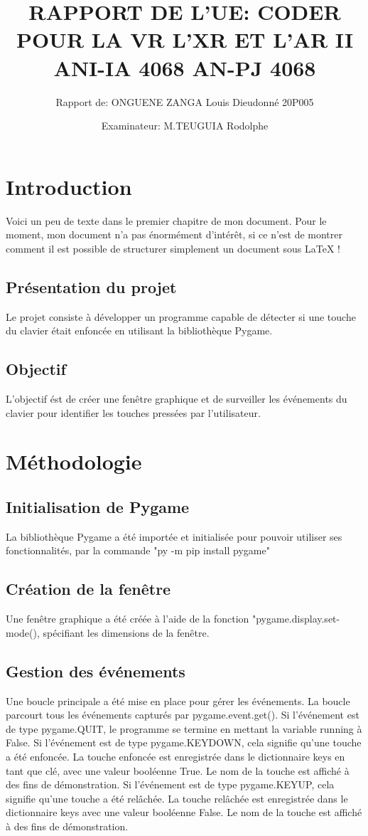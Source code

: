 \documentclass[11pt]{report}
\title{RAPPORT DE L'UE: CODER POUR LA VR L'XR ET L'AR II	ANI-IA 4068 AN-PJ 4068}
\author{Rapport de: ONGUENE ZANGA Louis Dieudonné 20P005}
\date{Examinateur: M.TEUGUIA Rodolphe}
\begin{document}
	\maketitle
	\tableofcontents
	

	\chapter{Introduction}
	Voici un peu de texte dans le premier chapitre de mon document. Pour le moment, mon document n'a pas énormément d'intérêt, si ce n'est de montrer comment il est possible de structurer simplement un document sous LaTeX !
	\section{Présentation du projet}
	Le projet consiste à développer un programme capable de détecter si une touche du clavier était enfoncée en utilisant la bibliothèque Pygame. 
	
	\begin{figure}
		\centering
	
		
		\label{fig:toutatis}
	\end{figure}
	
	\section{Objectif}
L'objectif ést de créer une fenêtre graphique et de surveiller les événements du clavier pour identifier les touches pressées par l'utilisateur.
	\chapter{Méthodologie}
	\section{Initialisation de Pygame}
	La bibliothèque Pygame a été importée et initialisée pour pouvoir utiliser ses fonctionnalités, par la commande "py -m pip install pygame"
	\section{Création de la fenêtre}
	Une fenêtre graphique a été créée à l'aide de la fonction "pygame.display.set-mode(), spécifiant les dimensions de la fenêtre.
	\section{Gestion des événements}
	Une boucle principale a été mise en place pour gérer les événements.
	La boucle parcourt tous les événements capturés par pygame.event.get().
	Si l'événement est de type pygame.QUIT, le programme se termine en mettant la variable running à False.
	Si l'événement est de type pygame.KEYDOWN, cela signifie qu'une touche a été enfoncée.
	La touche enfoncée est enregistrée dans le dictionnaire keys en tant que clé, avec une valeur booléenne True.
	Le nom de la touche est affiché à des fins de démonstration.
	Si l'événement est de type pygame.KEYUP, cela signifie qu'une touche a été relâchée.
	La touche relâchée est enregistrée dans le dictionnaire keys avec une valeur booléenne False.
	Le nom de la touche est affiché à des fins de démonstration.
\end{document}
